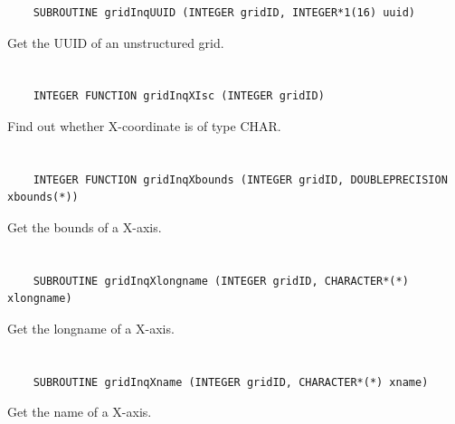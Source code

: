\begin{verbatim}
    SUBROUTINE gridInqUUID (INTEGER gridID, INTEGER*1(16) uuid)
\end{verbatim}

Get the UUID of an unstructured grid.


\section*{\tt {}}

\begin{verbatim}
    INTEGER FUNCTION gridInqXIsc (INTEGER gridID)
\end{verbatim}

Find out whether X-coordinate is of type CHAR.


\section*{\tt {}}

\begin{verbatim}
    INTEGER FUNCTION gridInqXbounds (INTEGER gridID, DOUBLEPRECISION xbounds(*))
\end{verbatim}

Get the bounds of a X-axis.


\section*{\tt {}}

\begin{verbatim}
    SUBROUTINE gridInqXlongname (INTEGER gridID, CHARACTER*(*) xlongname)
\end{verbatim}

Get the longname of a X-axis.


\section*{\tt {}}

\begin{verbatim}
    SUBROUTINE gridInqXname (INTEGER gridID, CHARACTER*(*) xname)
\end{verbatim}

Get the name of a X-axis.


\section*{\tt {}}

